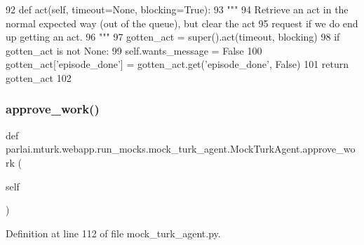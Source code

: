 \begin{DoxyCode}
92     \textcolor{keyword}{def }act(self, timeout=None, blocking=True):
93         \textcolor{stringliteral}{"""}
94 \textcolor{stringliteral}{        Retrieve an act in the normal expected way (out of the queue), but clear the act}
95 \textcolor{stringliteral}{        request if we do end up getting an act.}
96 \textcolor{stringliteral}{        """}
97         gotten\_act = super().act(timeout, blocking)
98         \textcolor{keywordflow}{if} gotten\_act \textcolor{keywordflow}{is} \textcolor{keywordflow}{not} \textcolor{keywordtype}{None}:
99             self.wants\_message = \textcolor{keyword}{False}
100             gotten\_act[\textcolor{stringliteral}{'episode\_done'}] = gotten\_act.get(\textcolor{stringliteral}{'episode\_done'}, \textcolor{keyword}{False})
101         \textcolor{keywordflow}{return} gotten\_act
102 
\end{DoxyCode}
\mbox{\label{classparlai_1_1mturk_1_1webapp_1_1run__mocks_1_1mock__turk__agent_1_1MockTurkAgent_ae57ab3c911012c54e0868a4a37e6b199}} 
\subsubsection{\texorpdfstring{approve\+\_\+work()}{approve\_work()}}
{\footnotesize\ttfamily def parlai.\+mturk.\+webapp.\+run\+\_\+mocks.\+mock\+\_\+turk\+\_\+agent.\+Mock\+Turk\+Agent.\+approve\+\_\+work (\begin{DoxyParamCaption}\item[{}]{self }\end{DoxyParamCaption})}



Definition at line 112 of file mock\+\_\+turk\+\_\+agent.\+py.


